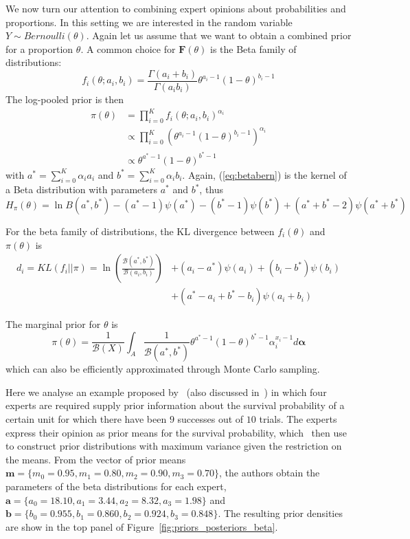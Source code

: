 \documentclass[a4paper, notitlepage, 10pt]{article}
\begin{document}
We now turn our attention to combining expert opinions about probabilities and proportions.
In this setting we are interested in the random variable $Y\sim Bernoulli(\theta)$.
Again let us assume that we want to obtain a combined prior for a proportion $\theta$.
A common choice for $\mathbf{F}(\theta)$ is the Beta family of distributions:
$$f_i(\theta;a_i, b_i) = \frac{\Gamma(a_i + b_i)}{\Gamma(a_i b_i)} \theta^{a_i-1}(1-\theta)^{b_i-1}$$
The log-pooled prior is then
\begin{align}
\pi(\theta)&=\prod_{i=0}^{K}f_i(\theta;a_i,b_i)^{\alpha_i}\\
&\propto \prod_{i=0}^{K} \left(\theta^{a_i-1}(1-\theta)^{b_i-1} \right)^{\alpha_i}\\
\label{eq:betabern}
&\propto \theta^{a^*-1}(1-\theta)^{b^*-1}
\end{align}
with $a^* =\sum_{i=0}^{K}\alpha_ia_i$ and $b^* = \sum_{i=0}^{K}\alpha_ib_i$.
Again, (\ref{eq:betabern}) is the kernel of a Beta distribution with parameters $a^*$ and $b^*$, thus 
\begin{equation}
 \label{eq:entropybeta}
 H_{\pi}(\theta) = \ln B(a^*,b^*) - (a^*-1)\psi(a^*) - (b^*-1)\psi(b^*) + (a^*+b^* -2)\psi(a^*+b^*)
\end{equation}

For the beta family of distributions, the KL divergence between $f_i(\theta)$ and $\pi(\theta)$ is
\begin{equation}
\begin{split}
 \label{eq:KLbeta}
 d_i = KL(f_i||\pi) = \ln\left(\frac{\mathcal{B}(a^*, b^*)}{\mathcal{B}(a_i, 
b_i)}\right) &+ (a_i-a^*)\psi(a_i)+ (b_i-b^*)\psi(b_i) \\
 &+ (a^*-a_i + b^* - b_i)\psi(a_i+b_i)
\end{split}
 \end{equation}

The marginal prior for $\theta$ is
\begin{equation}
\label{eq:marginalbeta}
\pi(\theta) = \frac{1}{\mathcal{B}(X)}\int_{A} \frac{1}{\mathcal{B}(a^*, b^*)} \theta^{a^* -1}(1-\theta)^{b^* -1}\alpha_i^{x_i-1}d\boldsymbol\alpha 
\end{equation}
which can also be efficiently approximated through Monte Carlo sampling.

Here we analyse an example proposed by~\cite{savchuk1994} (also discussed in~\cite{rufo2012B}) in which four experts are required supply prior information about the survival probability of a certain unit for which there have been $9$ successes out of $10$ trials.
The experts express their opinion as prior means for the survival probability, which~\cite{savchuk1994} then use to construct prior distributions with maximum variance given the restriction on the means.
From the vector of prior means $\mathbf{m} = \{ m_0 = 0.95, m_1 = 0.80, m_2 = 0.90, m_3 = 0.70 \}$, the authors obtain the parameters of the beta distributions for each expert,  $\mathbf{a} = \{ a_0 = 18.10, a_1 = 3.44 , a_2 = 8.32, a_3 = 1.98 \}$ and  $\mathbf{b} = \{ b_0 = 0.955 , b_1 = 0.860, b_2 = 0.924, b_3 = 0.848\}$.
The resulting prior densities are show in the top panel of Figure~\ref{fig:priors_posteriors_beta}.
\end{document}
